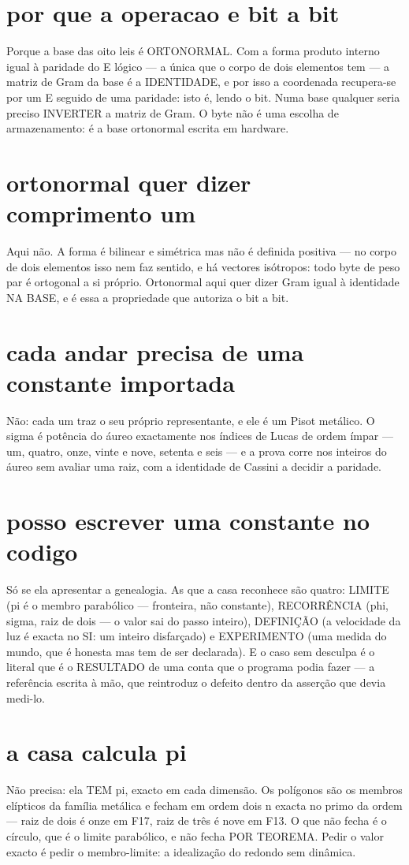 \documentclass[11pt,a4paper]{article}
\begin{document}
\section{por que a operacao e bit a bit}
Porque a base das oito leis é ORTONORMAL. Com a forma produto interno igual à paridade do
E lógico — a única que o corpo de dois elementos tem — a matriz de Gram da base é a
IDENTIDADE, e por isso a coordenada recupera-se por um E seguido de uma paridade: isto é,
lendo o bit. Numa base qualquer seria preciso INVERTER a matriz de Gram. O byte não é uma
escolha de armazenamento: é a base ortonormal escrita em hardware.

\section{ortonormal quer dizer comprimento um}
Aqui não. A forma é bilinear e simétrica mas não é definida positiva — no corpo de dois
elementos isso nem faz sentido, e há vectores isótropos: todo byte de peso par é ortogonal
a si próprio. Ortonormal aqui quer dizer Gram igual à identidade NA BASE, e é essa a
propriedade que autoriza o bit a bit.

\section{cada andar precisa de uma constante importada}
Não: cada um traz o seu próprio representante, e ele é um Pisot metálico. O sigma é
potência do áureo exactamente nos índices de Lucas de ordem ímpar — um, quatro, onze,
vinte e nove, setenta e seis — e a prova corre nos inteiros do áureo sem avaliar uma raiz,
com a identidade de Cassini a decidir a paridade.

\section{posso escrever uma constante no codigo}
Só se ela apresentar a genealogia. As que a casa reconhece são quatro: LIMITE (pi é o
membro parabólico — fronteira, não constante), RECORRÊNCIA (phi, sigma, raiz de dois — o
valor sai do passo inteiro), DEFINIÇÃO (a velocidade da luz é exacta no SI: um inteiro
disfarçado) e EXPERIMENTO (uma medida do mundo, que é honesta mas tem de ser declarada).
E o caso sem desculpa é o literal que é o RESULTADO de uma conta que o programa podia
fazer — a referência escrita à mão, que reintroduz o defeito dentro da asserção que devia
medi-lo.

\section{a casa calcula pi}
Não precisa: ela TEM pi, exacto em cada dimensão. Os polígonos são os membros elípticos da
família metálica e fecham em ordem dois n exacta no primo da ordem — raiz de dois é onze
em F17, raiz de três é nove em F13. O que não fecha é o círculo, que é o limite
parabólico, e não fecha POR TEOREMA. Pedir o valor exacto é pedir o membro-limite: a
idealização do redondo sem dinâmica.
\end{document}
